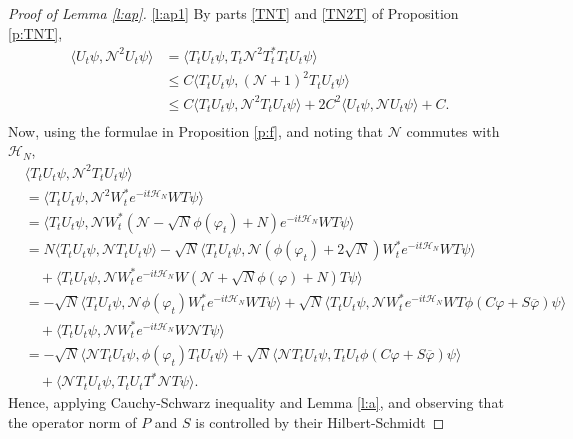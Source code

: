 \documentclass[11pt,a4paper]{scrartcl}
\newcommand{\N}{\mathcal{N}}
\begin{document}
\begin{proof}[Proof of Lemma \ref{l:ap}]
  \ref{l:ap1} By parts \eqref{TNT} and \eqref{TN2T} of Proposition \ref{p:TNT},
  \begin{equation}
    \label{ep4}
    \begin{split}
      \langle U_t \psi, \N^2 U_t \psi \rangle & = \langle T_t U_t \psi, T_t
      \N^2 T_t^* T_t U_t \psi \rangle \\
      & \le C \langle T_t U_t \psi, (\N+1)^2 T_t U_t \psi \rangle \\
      & \le C \langle T_t U_t \psi, \N^2 T_t U_t \psi \rangle + 2 C^2 \langle
      U_t \psi, \N U_t \psi \rangle + C. \\
    \end{split}
  \end{equation} 
  Now, using the formulae in Proposition \ref{p:f}, and noting that $\N$
  commutes with $\mathcal{H}_N$,
  \begin{align*}
    & \langle T_t U_t \psi, \N^2 T_t U_t \psi \rangle \\
    & = \langle T_t U_t \psi, \N^2 W_t^* e^{-it \mathcal{H}_N} WT \psi \rangle
    \\
    & = \langle T_t U_t \psi, \N W_t^* (\N - \sqrt{N} \phi(\varphi_t) + N)
    e^{-it \mathcal{H}_N} WT \psi \rangle \\
    & = N \langle T_t U_t \psi, \N T_t U_t \psi \rangle - \sqrt{N} \langle T_t
    U_t \psi, \N ( \phi(\varphi_t) + 2\sqrt{N}) W_t^* e^{-it\mathcal{H}_N} WT
    \psi \rangle \\
    & \quad + \langle T_t U_t \psi, \N W_t^* e^{-it\mathcal{H}_N} W(\N +
    \sqrt{N} \phi(\varphi) + N) T \psi \rangle \\
    & = - \sqrt{N} \langle T_t U_t \psi, \N \phi(\varphi_t) W_t^*
    e^{-it\mathcal{H}_N} WT \psi \rangle + \sqrt{N} \langle T_t U_t \psi, \N
    W_t^* e^{-it\mathcal{H}_N} W T \phi(C \varphi + S \overline{\varphi}) \psi
    \rangle \\
    & \quad + \langle T_t U_t \psi, \N W_t^* e^{-it\mathcal{H}_N} W \N T \psi
    \rangle \\
    & = - \sqrt{N} \langle \N T_t U_t \psi, \phi(\varphi_t) T_t U_t \psi
    \rangle + \sqrt{N} \langle \N T_t U_t \psi, T_t U_t \phi(C \varphi + S
    \overline{\varphi}) \psi \rangle \\
    & \quad + \langle \N T_t U_t \psi, T_t U_t T^* \N T \psi \rangle.
  \end{align*}
  Hence, applying Cauchy-Schwarz inequality and Lemma \ref{l:a}, and observing
  that the operator norm of $P$ and $S$ is controlled by their Hilbert-Schmidt

\end{proof}
\end{document}
